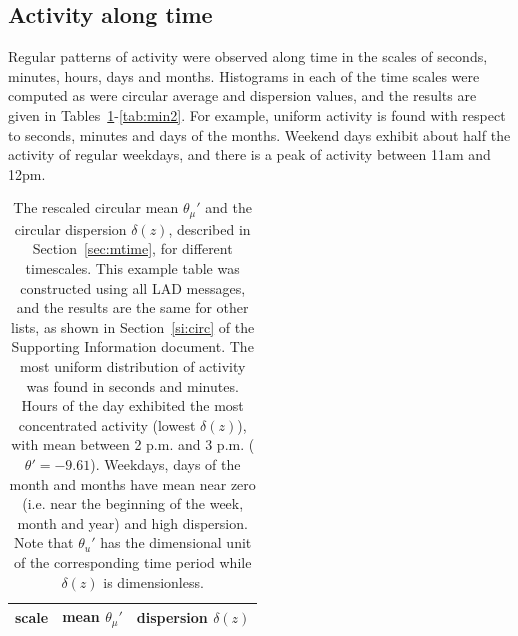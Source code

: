\documentclass[%
aip,
jmp,%
amsmath,amssymb,
reprint,%
]{revtex4-1}
\begin{document}
\subsection{Activity along time}\label{constDisc}
Regular patterns of activity were observed along time
in the scales of seconds, minutes, hours, days and months.
Histograms in each of the time scales were computed as were circular average and dispersion values, and the results are given in Tables~\ref{tab:circ}-\ref{tab:min2}. For example, uniform activity is found with respect to seconds, minutes and days of the months. Weekend days exhibit about half the activity of regular weekdays, and there is a peak of activity between 11am and 12pm.


\begin{table}
\caption{The rescaled circular mean $\theta_\mu'$ and the circular dispersion $\delta(z)$, described in Section~\ref{sec:mtime}, for different timescales. This example table was constructed using all LAD messages, and the results are the same for other lists, as shown in Section~\ref{si:circ} of the Supporting Information document. The most uniform distribution of activity was found in seconds and minutes. 	Hours of the day exhibited the most concentrated activity (lowest $\delta(z)$), with mean between 2 p.m. and 3 p.m. ($\theta'=-9.61$). Weekdays, days of the month and months have mean near zero (i.e. near the beginning of the week, month and year) and high dispersion. Note that $\theta_u'$ has the dimensional unit of the corresponding time period while $\delta(z)$ is dimensionless.}
\begin{center}
\begin{tabular}{ |l|| c|c| }
\hline
scale & mean $\theta_\mu'$ & dispersion $\delta(z)$  \\ \hline

\end{tabular}
\end{center}
\label{tab:circ}
\end{table}

\begin{table}
\caption{Activity percentages along the hours of the day. Nearly identical distributions were observed on other social systems as shown in Section~\ref{si:hours} of the Supporting Information document.
Highest activity was observed between noon and 6pm (with 1/3 of total day activity), followed by the time period between 6pm and midnight.
Around 2/3 of the activity takes place from noon to midnight
but the activity peak occurs between 11 a.m. and 12 p.m.
This table shows results for the activity in CPP.}
\footnotesize

\label{tab:hin}
\end{table}
\end{document}
